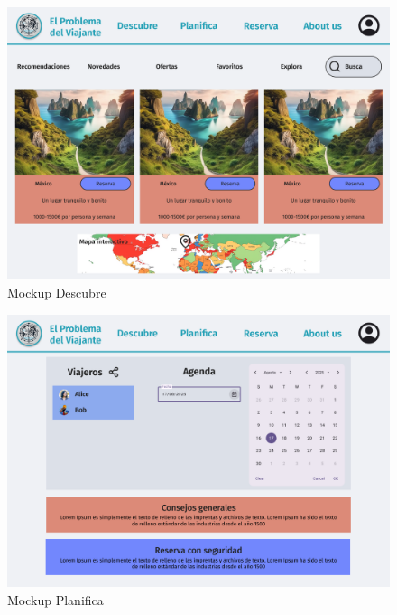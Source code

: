 \documentclass[11pt, a4paper]{book}
\begin{document}
	\begin{figure} [H]
		\centering
		\includegraphics[width=\textwidth]{mockup-descubre.png}
		\caption{Mockup Descubre}
	\end{figure}
	
	\begin{figure} [H]
		\centering
		\includegraphics[width=\textwidth]{mockup-planifica.png}
		\caption{Mockup Planifica}
	\end{figure}
	
\end{document}
